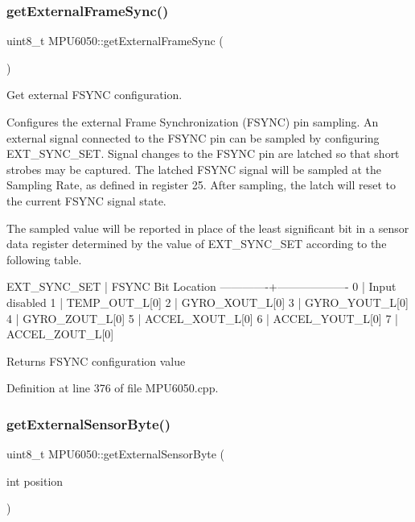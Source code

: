 \subsubsection{\texorpdfstring{getExternalFrameSync()}{getExternalFrameSync()}}
{\footnotesize\ttfamily uint8\+\_\+t M\+P\+U6050\+::get\+External\+Frame\+Sync (\begin{DoxyParamCaption}{ }\end{DoxyParamCaption})}



Get external F\+S\+Y\+NC configuration. 

Configures the external Frame Synchronization (F\+S\+Y\+NC) pin sampling. An external signal connected to the F\+S\+Y\+NC pin can be sampled by configuring E\+X\+T\+\_\+\+S\+Y\+N\+C\+\_\+\+S\+ET. Signal changes to the F\+S\+Y\+NC pin are latched so that short strobes may be captured. The latched F\+S\+Y\+NC signal will be sampled at the Sampling Rate, as defined in register 25. After sampling, the latch will reset to the current F\+S\+Y\+NC signal state.

The sampled value will be reported in place of the least significant bit in a sensor data register determined by the value of E\+X\+T\+\_\+\+S\+Y\+N\+C\+\_\+\+S\+ET according to the following table.


\begin{DoxyPre}
EXT\_SYNC\_SET | FSYNC Bit Location
-------------+-------------------
0            | Input disabled
1            | TEMP\_OUT\_L[0]
2            | GYRO\_XOUT\_L[0]
3            | GYRO\_YOUT\_L[0]
4            | GYRO\_ZOUT\_L[0]
5            | ACCEL\_XOUT\_L[0]
6            | ACCEL\_YOUT\_L[0]
7            | ACCEL\_ZOUT\_L[0]
\end{DoxyPre}


\begin{DoxyReturn}{Returns}
F\+S\+Y\+NC configuration value 
\end{DoxyReturn}


Definition at line 376 of file M\+P\+U6050.\+cpp.

\mbox{\label{classMPU6050_a7f786ab4264f40e5a95e8937ec9adcc2}} 
\subsubsection{\texorpdfstring{getExternalSensorByte()}{getExternalSensorByte()}}
{\footnotesize\ttfamily uint8\+\_\+t M\+P\+U6050\+::get\+External\+Sensor\+Byte (\begin{DoxyParamCaption}\item[{int}]{position }\end{DoxyParamCaption})}



